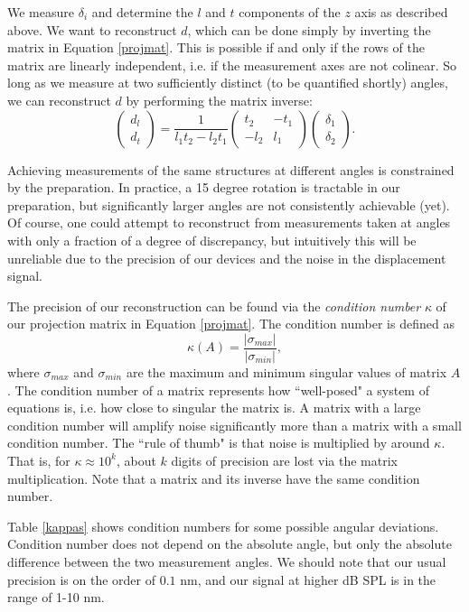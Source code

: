 \documentclass[aip,cp,amsmath,amssymb,reprint]{revtex4-2}
\begin{document}
\par{We measure $\delta_i$ and determine the $l$ and $t$ components of the $z$ axis as described above. We want to reconstruct $d$, which can be done simply by inverting the matrix in Equation \ref{projmat}. This is possible if and only if the rows of the matrix are linearly independent, i.e. if the measurement axes are not colinear. So long as we measure at two sufficiently distinct (to be quantified shortly) angles, we can reconstruct $d$ by performing the matrix inverse:
     \begin{equation}\label{fullreconstruct}
         \begin{pmatrix}d_l\\d_t\end{pmatrix}=\frac{1}{l_1 t_2 - l_2 t_1}\begin{pmatrix}t_2&-t_1\\-l_2  & l_1\end{pmatrix}\begin{pmatrix}\delta_1\\ \delta_2\end{pmatrix}.
     \end{equation}
}
\par{Achieving measurements of the same structures at different angles is constrained by the preparation. In practice, a 15 degree rotation is tractable in our preparation, but significantly larger angles are not consistently achievable (yet). Of course, one could attempt to reconstruct from measurements taken at angles with only a fraction of a degree of discrepancy, but intuitively this will be unreliable due to the precision of our devices and the noise in the displacement signal.}
\par{The precision of our reconstruction can be found via the \textit{condition number} $\kappa$ of our projection matrix in Equation \ref{projmat}. The condition number is defined as
     \begin{equation}
         \kappa (A) = \frac{|\sigma_{max}|}{|\sigma_{min}|},
     \end{equation}
where $\sigma_{max}$ and $\sigma_{min}$ are the maximum and minimum singular values of matrix $A$. The condition number of a matrix represents how ``well-posed" a system of equations is, i.e. how close to singular the matrix is. A matrix with a large condition number will amplify noise significantly more than a matrix with a small condition number. The ``rule of thumb" is that noise is multiplied by around $\kappa$. That is, for $\kappa \approx 10^k$, about $k$ digits of precision are lost via the matrix multiplication. Note that a matrix and its inverse have the same condition number.
}
\par{Table \ref{kappas} shows condition numbers for some possible angular deviations. Condition number does not depend on the absolute angle, but only the absolute difference between the two measurement angles. We should note that our usual precision is on the order of $0.1$ nm, and our signal at higher dB SPL is in the range of 1-10 nm.}
 
\end{document}
